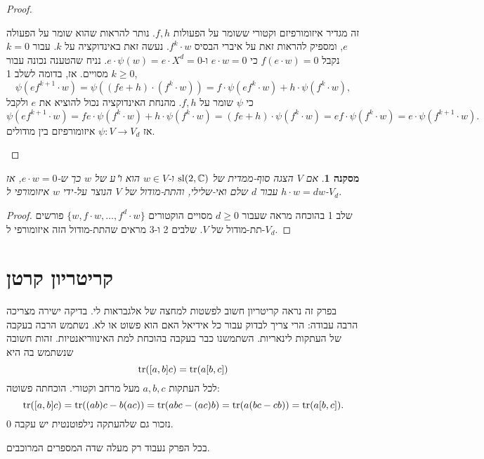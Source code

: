\documentclass{report}
\theoremstyle{break}
\newtheorem{corollary}[corollary]{מסקנה}
\theoremstyle{MyNonumberbreak}
\newtheorem{proof}{הוכחה}
\begin{document}
\begin{proof}
\begin{itemize}
		זה מגדיר איזומורפיזם וקטורי ששומר על הפעולות $f, h$. נותר להראות שהוא שומר על הפעולה $e$, ומספיק להראות זאת על איברי הבסיס $f^k \cdot w$. נעשה זאת באינדוקציה על $k$. עבור $k = 0$ נקבל $f(e \cdot w) = 0$ כי $e \cdot w = 0$ ו-$e \cdot \psi(w) = e \cdot X^d = 0$. נניח שהטענה נכונה עבור $k \ge 0$ מסויים. אז, בדומה לשלב 1,
		\[ \psi(ef^{k+1} \cdot w) = \psi((fe + h) \cdot (f^k \cdot w)) = f \cdot \psi(ef^k \cdot w) + h \cdot \psi(f^k \cdot w), \]
		כי $\psi$ שומר על $f, h$. מהנחת האינדוקציה נכול להוציא את $e$ ולקבל
		\[ \psi(ef^{k+1} \cdot w) = fe \cdot \psi(f^k \cdot w) + h \cdot \psi(f^k \cdot w) = (fe + h) \cdot \psi(f^k \cdot w) = ef \cdot \psi(f^k \cdot w) = e \cdot \psi(f^{k+1} \cdot w). \]
		אז $\psi : V \to V_d$ איזומורפיזם בין מודולים.
	\end{itemize}
\end{proof}
\begin{corollary}
	אם $V$ הצגה סוף-ממדית של $\operatorname{sl}(2, \operatorname{\mathbb{C}})$ ו-$w \in V$ הוא ו"ע של $w$ כך ש-$e \cdot w = 0$, אז $h \cdot w = dw$ עבור $d$ שלם ואי-שלילי, והתת-מודול של $V$ הנוצר על-ידי $w$ איזומורפי ל-$V_d$.
\end{corollary}
\begin{proof}
	שלב 1 בהוכחה מראה שעבור $d \ge 0$ מסויים הוקטורים $\{w, f \cdot w, \ldots, f^d \cdot w\}$ פורשים תת-מודול של $V$. שלבים 2 ו-3 מראים שהתת-מודול הזה איזומורפי ל-$V_d$.
\end{proof}


\chapter{קריטריון קרטן}
בפרק זה נראה קריטריון חשוב לפשטות למחצה של אלגבראות לי. בדיקה ישירה מצריכה הרבה עבודה: הרי צריך לבדוק עבור כל אידיאל האם הוא פשוט או לא. נשתמש הרבה בעקבה של העתקות לינאריות. השתמשנו כבר בעקבה בהוכחת למת האינווריאנטיות. זהות חשובה שנשתמש בה היא
\[ \operatorname{tr}([a, b]c) = \operatorname{tr}(a[b, c]) \]
לכל העתקות $a, b, c$ מעל מרחב וקטורי. הוכחתה פשוטה:
\[ \operatorname{tr}([a, b]c) = \operatorname{tr}((ab)c - b(ac)) = \operatorname{tr}(abc - (ac)b) = \operatorname{tr}(a(bc - cb)) = \operatorname{tr}(a[b, c]). \]
נזכור גם שלהעתקה נילפוטנטית יש עקבה 0.

בכל הפרק נעבוד רק מעלה שדה המספרים המרוכבים.
\end{document}

